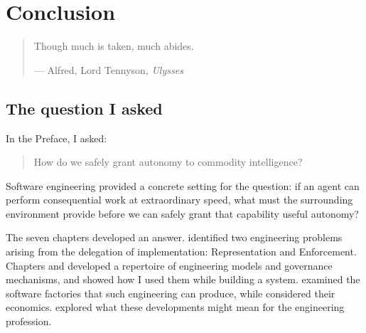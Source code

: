 


\chapter{Conclusion}


\begin{quote}
Though much is taken, much abides.

--- Alfred, Lord Tennyson, \emph{Ulysses}
\end{quote}

\section{The question I asked}\label{heading:the-question-i-asked}

In the Preface, I asked:


\begin{quote}
How do we safely grant autonomy to commodity intelligence?
\end{quote}

Software engineering provided a concrete setting for the question: if an agent can perform consequential work at extraordinary speed, what must the surrounding environment provide before we can safely grant that capability useful autonomy?

The seven chapters developed an answer.  identified two engineering problems arising from the delegation of implementation: Representation and Enforcement. Chapters  and  developed a repertoire of engineering models and governance mechanisms, and  showed how I used them while building a system.  examined the software factories that such engineering can produce, while  considered their economics.  explored what these developments might mean for the engineering profession.

